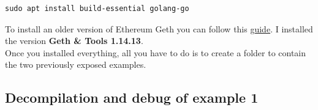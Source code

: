 \documentclass{scrbook}
\begin{document}
\begin{lstlisting}[caption={Bash command to install the Geth requirements}]
    sudo apt install build-essential golang-go
\end{lstlisting}

To install an older version of Ethereum Geth you can follow this \href{https://medium.com/@jeffrey.kao.taipei/how-to-install-specific-older-version-etherium-geth-on-linux-3b9be9fed470}{guide}. I installed the version \textbf{Geth \& Tools 1.14.13}.\\

Once you installed everything, all you have to do is to create a folder to contain the two previously exposed examples.

\subsection{Decompilation and debug of example 1}
\end{document}
